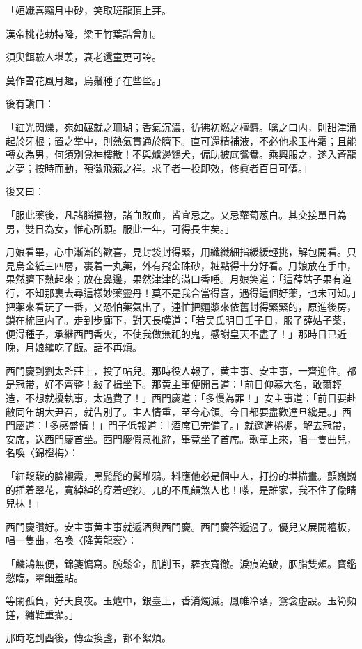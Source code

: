 「姮娥喜竊月中砂，笑取斑龍頂上芽。

漢帝桃花勅特降，梁王竹葉誥曾加。

須臾餌驗人堪羡，衰老還童更可誇。

莫作雪花風月趣，烏鬚種子在些些。」

後有讚曰：

「紅光閃爍，宛如碾就之珊瑚；香氣沉濃，彷彿初燃之檀麝。噙之口内，則甜津涌起於牙根；置之掌中，則熱氣貫通於臍下。直可還精補液，不必他求玉杵霜；且能轉女為男，何須別覓神樓散！不與爐邊鷄犬，偏助被底鴛鴦。乘興服之，遂入蒼龍之夢；按時而動，預徵飛燕之祥。求子者一投即效，修眞者百日可僊。」

後又曰：

「服此薬後，凡諸腦損物，諸血敗血，皆宜忌之。又忌蘿蔔葱白。其交接單日為男，雙日為女，惟心所願。服此一年，可得長生矣。」

月娘看畢，心中漸漸的歡喜，見封袋封得緊，用纖纖細指緩緩輕挑，解包開看。只見烏金紙三四層，裹着一丸薬，外有飛金硃砂，粧點得十分好看。月娘放在手中，果然臍下熱起來；放在鼻邊，果然津津的滿口香唾。月娘笑道：「這薛姑子果有道行，不知那裏去尋這樣妙薬靈丹！莫不是我合當得喜，遇得這個好薬，也未可知。」把薬來看玩了一番，又恐怕薬氣出了，連忙把麵漿來依舊封得緊緊的，原進後房，鎖在梳匣内了。走到步廊下，對天長嘆道：「若吴氏明日壬子日，服了薛姑子薬，便淂種子，承継西門香火，不使我做無祀的鬼，感謝皇天不盡了！」那時日已近晚，月娘纔吃了飯。話不再煩。

西門慶到劉太監莊上，投了帖兒。那時役人報了，黄主事、安主事，一齊迎住。都是冠带，好不齊整！敍了揖坐下。那黄主事便開言道：「前日仰慕大名，敢爾輕造，不想就擾執事，太過費了！」西門慶道：「多慢為罪！」安主事道：「前日要赴敝同年胡大尹召，就告別了。主人情重，至今心領。今日都要盡歡達旦纔是。」西門慶道：「多感盛情！」門子低報道：「酒席已完備了。」就邀進捲棚，解去冠帶，安席，送西門慶首坐。西門慶假意推辭，畢竟坐了首席。歌童上來，唱一隻曲兒，名喚〈錦橙梅〉：

「紅馥馥的臉襯霞，黑髭髭的鬢堆鴉。料應他必是個中人，打扮的堪描畫。顫巍巍的插着翠花，寬綽綽的穿着輕紗。兀的不風韻煞人也！嗏，是誰家，我不住了偸睛兒抹！」

西門慶讚好。安主事黄主事就遞酒與西門慶。西門慶答遞過了。優兒又展開檀板，唱一隻曲，名喚〈降黄龍衮〉：

「麟鴻無便，錦箋慵寫。腕鬆金，肌削玉，羅衣寬徹。淚痕淹破，胭脂雙頰。寳鑑愁臨，翠鈿羞貼。

等閑孤負，好天良夜。玉爐中，銀臺上，香消燭滅。鳳帷冷落，鴛衾虚設。玉筍頻搓，繡鞋重攧。」

那時吃到酉後，傳盃換盞，都不絮煩。

